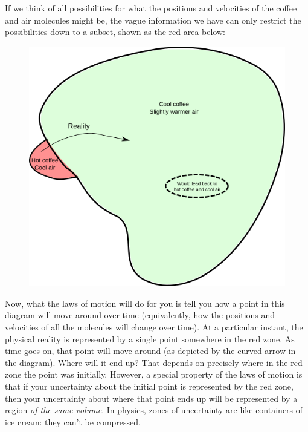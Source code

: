 \documentclass[a4paper, 12pt]{article}
\begin{document}
If we think of all possibilities for what the positions and velocities of the
coffee and air molecules might be, the vague information we have
can only restrict the possibilities down to a subset, shown as the red area
below:

\begin{figure}[ht!]
\centering
\includegraphics[scale=0.6]{diagrams.png}
\end{figure}

Now, what the laws of motion will do for you is tell you how a point in this
diagram will move around over time
(equivalently, how the positions and velocities of all the molecules will
change over time). At a particular instant, the physical
reality is represented by a single point somewhere in the red zone. As time
goes on, that point will move around (as depicted by the curved arrow in
the diagram). Where will it end up? That depends on precisely where in the
red zone the point was initially. However, a special property of the laws of
motion is that if your uncertainty about the initial point is represented by
the red zone, then your uncertainty about where that point ends up will be
represented by a region {\em of the same volume}.
In physics, zones of uncertainty are
like containers of ice cream: they can't be compressed.
\end{document}
